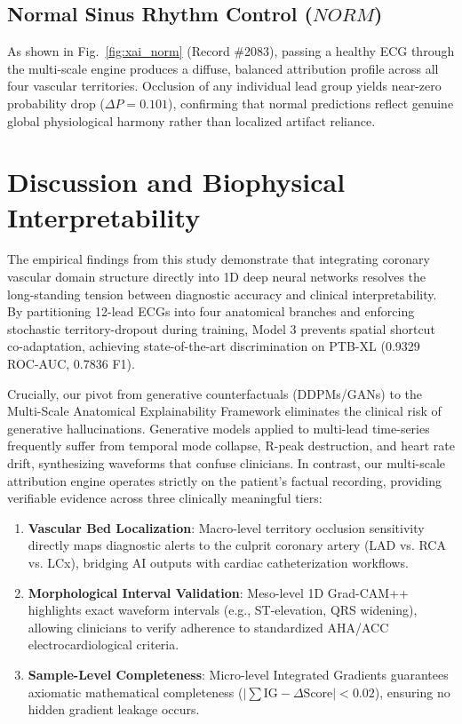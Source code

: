 \documentclass[5p,twocolumn,10pt]{elsarticle}
\begin{document}
\subsection{Normal Sinus Rhythm Control ($NORM$)}
As shown in Fig.~\ref{fig:xai_norm} (Record \#2083), passing a healthy ECG through the multi-scale engine produces a diffuse, balanced attribution profile across all four vascular territories. Occlusion of any individual lead group yields near-zero probability drop ($\Delta P = 0.101$), confirming that normal predictions reflect genuine global physiological harmony rather than localized artifact reliance.

\section{Discussion and Biophysical Interpretability}
\label{sec:discussion}

The empirical findings from this study demonstrate that integrating coronary vascular domain structure directly into 1D deep neural networks resolves the long-standing tension between diagnostic accuracy and clinical interpretability. By partitioning 12-lead ECGs into four anatomical branches and enforcing stochastic territory-dropout during training, Model 3 prevents spatial shortcut co-adaptation, achieving state-of-the-art discrimination on PTB-XL (0.9329 ROC-AUC, 0.7836 F1).

Crucially, our pivot from generative counterfactuals (DDPMs/GANs) to the Multi-Scale Anatomical Explainability Framework eliminates the clinical risk of generative hallucinations. Generative models applied to multi-lead time-series frequently suffer from temporal mode collapse, R-peak destruction, and heart rate drift, synthesizing waveforms that confuse clinicians. In contrast, our multi-scale attribution engine operates strictly on the patient's factual recording, providing verifiable evidence across three clinically meaningful tiers:
\begin{enumerate}
    \item \textbf{Vascular Bed Localization}: Macro-level territory occlusion sensitivity directly maps diagnostic alerts to the culprit coronary artery (LAD vs. RCA vs. LCx), bridging AI outputs with cardiac catheterization workflows.
    \item \textbf{Morphological Interval Validation}: Meso-level 1D Grad-CAM++ highlights exact waveform intervals (e.g., ST-elevation, QRS widening), allowing clinicians to verify adherence to standardized AHA/ACC electrocardiological criteria.
    \item \textbf{Sample-Level Completeness}: Micro-level Integrated Gradients guarantees axiomatic mathematical completeness ($|\sum \text{IG} - \Delta \text{Score}| < 0.02$), ensuring no hidden gradient leakage occurs.
\end{enumerate}
\end{document}
